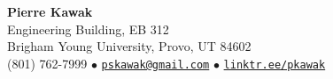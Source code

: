 \documentclass[letterpaper,11pt]{article}
\def\name{Pierre Kawak}
\begin{document}


\vspace*{-1.5\baselineskip}
\begin{center}
  {\LARGE \textbf{Pierre Kawak} }\\[1ex]
  Engineering Building, EB 312 \\
  Brigham Young University, Provo, UT 84602 \\  
  (801) 762-7999 $\bullet$ \href{mailto:pskawak@gmail.com}{\tt pskawak@gmail.com} $\bullet$ \href{https://linktr.ee/pkawak}{\tt linktr.ee/pkawak} \\
\end{center}


\vspace{-0.8cm}
\end{document}
